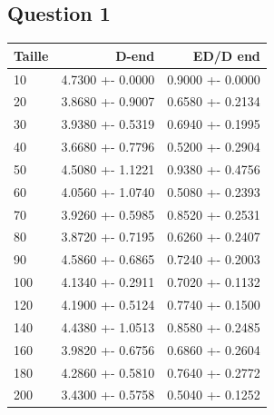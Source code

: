 \documentclass[a4paper]{article}
\begin{document}
\subsection{Question 1}
\begin{center}
\begin{tabular}{|l|r|r|}
  \hline
Taille & D-end & ED/D end \\ \hline
10 & 4.7300 +- 0.0000 & 0.9000 +- 0.0000 \\ \hline
20 & 3.8680 +- 0.9007 & 0.6580 +- 0.2134 \\ \hline
30 & 3.9380 +- 0.5319 & 0.6940 +- 0.1995 \\ \hline
40 & 3.6680 +- 0.7796 & 0.5200 +- 0.2904 \\ \hline
50 & 4.5080 +- 1.1221 & 0.9380 +- 0.4756 \\ \hline
60 & 4.0560 +- 1.0740 & 0.5080 +- 0.2393 \\ \hline
70 & 3.9260 +- 0.5985 & 0.8520 +- 0.2531 \\ \hline
80 & 3.8720 +- 0.7195 & 0.6260 +- 0.2407 \\ \hline
90 & 4.5860 +- 0.6865 & 0.7240 +- 0.2003 \\ \hline
100 & 4.1340 +- 0.2911 & 0.7020 +- 0.1132 \\ \hline
120 & 4.1900 +- 0.5124 & 0.7740 +- 0.1500 \\ \hline
140 & 4.4380 +- 1.0513 & 0.8580 +- 0.2485 \\ \hline
160 & 3.9820 +- 0.6756 & 0.6860 +- 0.2604 \\ \hline
180 & 4.2860 +- 0.5810 & 0.7640 +- 0.2772 \\ \hline
200 & 3.4300 +- 0.5758 & 0.5040 +- 0.1252 \\ \hline
\end{tabular}
\end{center}
\end{document}
